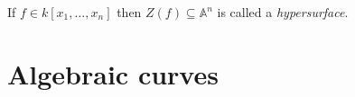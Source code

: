\documentclass[a4paper]{article}
\renewcommand{\A}{\mathbb{A}}
\begin{document}
\begin{definition}[hypersurface]
  If \(f \in k[x_1, \dots, x_n]\) then \(Z(f) \subseteq \A^n\) is called a \emph{hypersurface}.
\end{definition}























\iffalse

\section{Algebraic curves}
\end{document}
